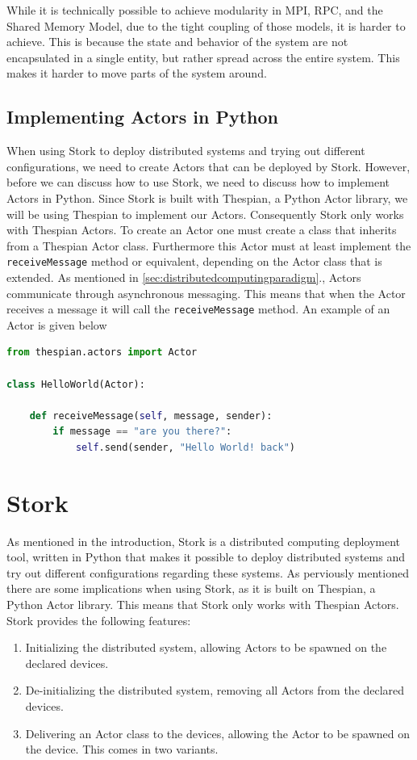 \documentclass[a4paper]{article}
\newcommand{\secref}[1]{\autoref{#1}.}
\begin{document}
While it is technically possible to achieve modularity in MPI, RPC, and the Shared Memory Model, due to the tight coupling of those models, it is harder to achieve. This is because the state and behavior of the system are not encapsulated in a single entity, but rather spread across the entire system. This makes it harder to move parts of the system around.
\subsection{Implementing Actors in Python}
When using Stork to deploy distributed systems and trying out different configurations, we need to create Actors that can be deployed by Stork. However, before we can discuss how to use Stork, we need to discuss how to implement Actors in Python. Since Stork is built with Thespian, a Python Actor library, we will be using Thespian to implement our Actors. Consequently Stork only works with Thespian Actors. To create an Actor one must create a class that inherits from a Thespian Actor class. Furthermore this Actor must at least implement the \lstinline{receiveMessage} method or equivalent, depending on the Actor class that is extended. As mentioned in \secref{sec:distributedcomputingparadigm}, Actors communicate through asynchronous messaging. This means that when the Actor receives a message it will call the \lstinline{receiveMessage} method. An example of an Actor is given below
\begin{lstlisting}[language=Python, caption=Actor example, label=lst:actor]
from thespian.actors import Actor

class HelloWorld(Actor):

    def receiveMessage(self, message, sender):
        if message == "are you there?":
            self.send(sender, "Hello World! back")
\end{lstlisting}
\section{Stork}
As mentioned in the introduction, Stork is a distributed computing deployment tool, written in Python that makes it possible to deploy distributed systems and try out different configurations regarding these systems. As perviously mentioned there are some implications when using Stork, as it is built on Thespian, a Python Actor library. This means that Stork only works with Thespian Actors. Stork provides the following features:
\begin{enumerate}
    \item Initializing the distributed system, allowing Actors to be spawned on the declared devices.
    \item De-initializing the distributed system, removing all Actors from the declared devices.
    \item Delivering an Actor class to the devices, allowing the Actor to be spawned on the device. This comes in two variants.
\end{enumerate}
\end{document}
